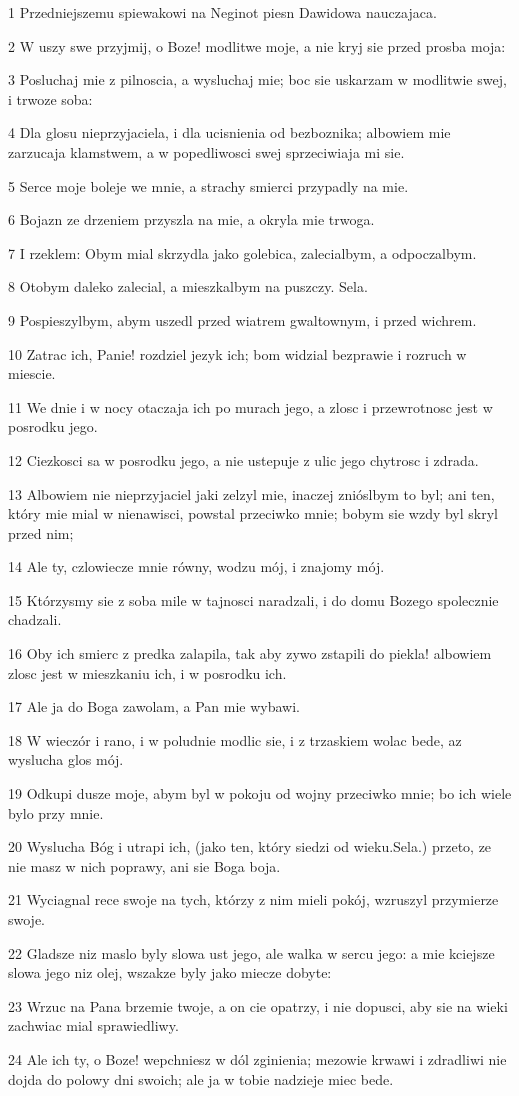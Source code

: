 \par 1 Przedniejszemu spiewakowi na Neginot piesn Dawidowa nauczajaca.
\par 2 W uszy swe przyjmij, o Boze! modlitwe moje, a nie kryj sie przed prosba moja:
\par 3 Posluchaj mie z pilnoscia, a wysluchaj mie; boc sie uskarzam w modlitwie swej, i trwoze soba:
\par 4 Dla glosu nieprzyjaciela, i dla ucisnienia od bezboznika; albowiem mie zarzucaja klamstwem, a w popedliwosci swej sprzeciwiaja mi sie.
\par 5 Serce moje boleje we mnie, a strachy smierci przypadly na mie.
\par 6 Bojazn ze drzeniem przyszla na mie, a okryla mie trwoga.
\par 7 I rzeklem: Obym mial skrzydla jako golebica, zalecialbym, a odpoczalbym.
\par 8 Otobym daleko zalecial, a mieszkalbym na puszczy. Sela.
\par 9 Pospieszylbym, abym uszedl przed wiatrem gwaltownym, i przed wichrem.
\par 10 Zatrac ich, Panie! rozdziel jezyk ich; bom widzial bezprawie i rozruch w miescie.
\par 11 We dnie i w nocy otaczaja ich po murach jego, a zlosc i przewrotnosc jest w posrodku jego.
\par 12 Ciezkosci sa w posrodku jego, a nie ustepuje z ulic jego chytrosc i zdrada.
\par 13 Albowiem nie nieprzyjaciel jaki zelzyl mie, inaczej znióslbym to byl; ani ten, który mie mial w nienawisci, powstal przeciwko mnie; bobym sie wzdy byl skryl przed nim;
\par 14 Ale ty, czlowiecze mnie równy, wodzu mój, i znajomy mój.
\par 15 Którzysmy sie z soba mile w tajnosci naradzali, i do domu Bozego spolecznie chadzali.
\par 16 Oby ich smierc z predka zalapila, tak aby zywo zstapili do piekla! albowiem zlosc jest w mieszkaniu ich, i w posrodku ich.
\par 17 Ale ja do Boga zawolam, a Pan mie wybawi.
\par 18 W wieczór i rano, i w poludnie modlic sie, i z trzaskiem wolac bede, az wyslucha glos mój.
\par 19 Odkupi dusze moje, abym byl w pokoju od wojny przeciwko mnie; bo ich wiele bylo przy mnie.
\par 20 Wyslucha Bóg i utrapi ich, (jako ten, który siedzi od wieku.Sela.) przeto, ze nie masz w nich poprawy, ani sie Boga boja.
\par 21 Wyciagnal rece swoje na tych, którzy z nim mieli pokój, wzruszyl przymierze swoje.
\par 22 Gladsze niz maslo byly slowa ust jego, ale walka w sercu jego: a mie kciejsze slowa jego niz olej, wszakze byly jako miecze dobyte:
\par 23 Wrzuc na Pana brzemie twoje, a on cie opatrzy, i nie dopusci, aby sie na wieki zachwiac mial sprawiedliwy.
\par 24 Ale ich ty, o Boze! wepchniesz w dól zginienia; mezowie krwawi i zdradliwi nie dojda do polowy dni swoich; ale ja w tobie nadzieje miec bede.


